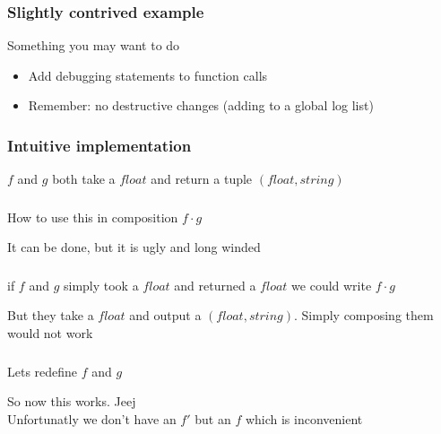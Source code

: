 \begin{frame}
    \frametitle{Slightly contrived example}
    \begin{block}{Something you may want to do}
        \begin{itemize}
            \item Add debugging statements to function calls
            \item Remember: no destructive changes (adding to a global log list)
        \end{itemize}
    \end{block}
\end{frame}

\begin{frame}[fragile]
    \frametitle{Intuitive implementation}
    \begin{block}{}
        
    \end{block}
    \begin{block}{}
        $f$ and $g$ both take a $float$ and return a tuple $(float, string)$
    \end{block}
\end{frame}

\begin{frame}[fragile]
    \frametitle{}
    \begin{block}{How to use this in composition $f \cdot g$}
        
    \end{block}
    \begin{block}{}
        It can be done, but it is ugly and long winded
    \end{block}
\end{frame}

\begin{frame}[fragile]
    \frametitle{}
    \begin{block}{}
        if $f$ and $g$ simply took a $float$ and returned a $float$ we could write $f \cdot g$
        
    \end{block}
    \begin{block}{}
        But they take a $float$ and output a $(float, string)$. Simply composing them would not work
        
    \end{block}
\end{frame}

\begin{frame}[fragile]
    \frametitle{}
    \begin{block}{}
        Lets redefine $f$ and $g$
        
        So now this works. Jeej \\
        Unfortunatly we don't have an $f'$ but an $f$ which is inconvenient
    \end{block}
\end{frame}

